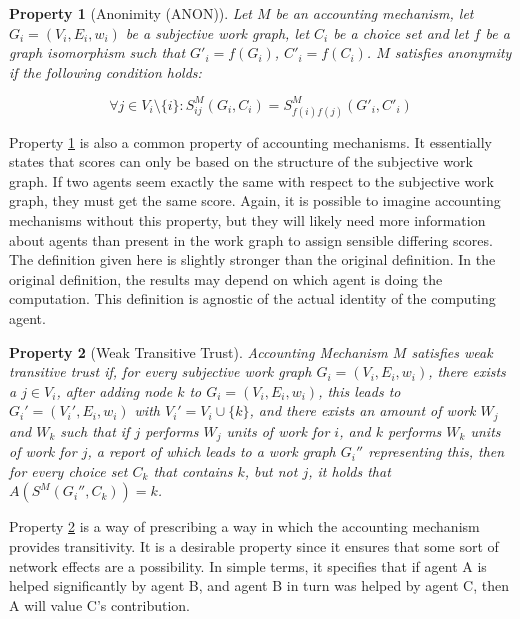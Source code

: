 \documentclass[a4paper,11pt]{book}
\newtheorem{property}{Property}
\theoremstyle{definition}
\begin{document}
\begin{property}[Anonimity (ANON)]
    Let $M$ be an accounting mechanism, let $G_i = (V_i, E_i, w_i)$ be a subjective work graph, let 
    $C_i$ be a choice set and let $f$ be a graph isomorphism such that $G'_i = f(G_i)$, $C'_i = f(C_i)$.
    $M$ satisfies anonymity if the following condition holds:

    \begin{equation*}
        \forall j \in V_i \setminus \{i\} : S_{ij}^M(G_i, C_i) = S_{f(i)f(j)}^M(G'_i, C'_i)
    \end{equation*}
    \label{prop:anon}
\end{property}

Property \ref{prop:anon} is also a common property of accounting mechanisms. It essentially states that
scores can only be based on the structure of the subjective work graph. If two agents seem exactly the
same with respect to the subjective work graph, they must get the same score. Again, it is possible
to imagine accounting mechanisms without this property, but they will likely need more information
about agents than present in the work graph to assign sensible differing scores.
The definition given here is slightly stronger than the original definition. In the original definition,
the results may depend on which agent is doing the computation. This definition is agnostic of the
actual identity of the computing agent.


\begin{property}[Weak Transitive Trust]
    Accounting Mechanism $M$ satisfies weak transitive trust if, for every subjective work graph 
    $G_i = (V_i, E_i, w_i)$, there exists a $j \in V_i$, after adding node $k$ to $G_i = (V_i, E_i, w_i)$,
    this leads to $G_i' = (V_i', E_i, w_i)$ with $V_i' = V_i \cup \{k\}$, and there exists an amount 
    of work $W_j$ and $W_k$ such that if $j$ performs $W_j$ units of work for $i$, and $k$ performs
    $W_k$ units of work for $j$, a report of which leads to a work graph $G_i''$ representing this,
    then for every choice set $C_k$ that contains $k$, but not $j$, it holds that $A(S^M(G_i'', C_k)) = k$.
    \label{prop:wtt}
\end{property}

Property \ref{prop:wtt} is a way of prescribing a way in which the accounting mechanism provides transitivity.
It is a desirable property since it ensures that some sort of network effects are a possibility.
In simple terms, it specifies that if agent A is helped significantly by agent B, and agent B in turn
was helped by agent C, then A will value C's contribution.
\end{document}
